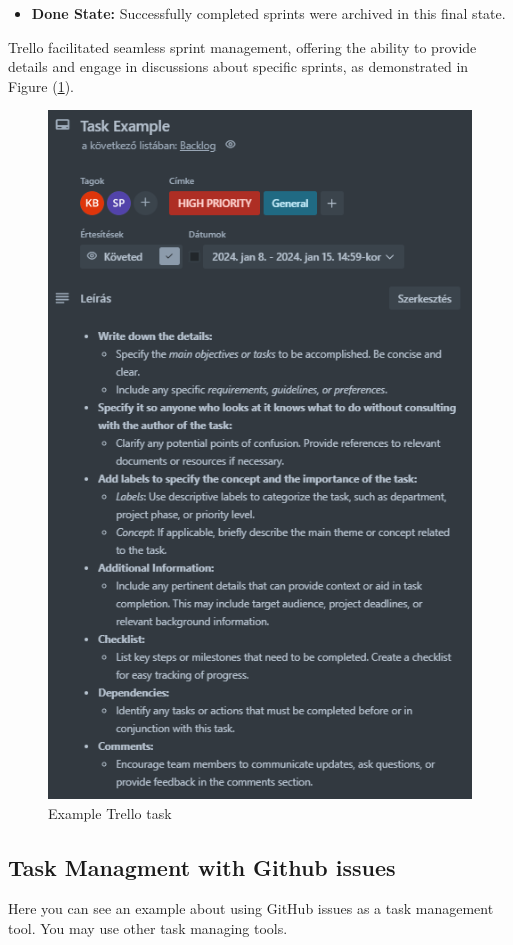 \documentclass[12pt,a4paper]{article}
\begin{document}
\begin{spacing}{1.5}
\begin{itemize}
        \item \textbf{Done State:}
              Successfully completed sprints were archived in this final state.

    \end{itemize}

    Trello facilitated seamless sprint management, offering the ability to provide
    details and engage in discussions about specific sprints, as demonstrated in
    Figure (\ref{fig:trello-task-example}).

    \begin{figure}[H]
        \centering
        \includegraphics[width=0.7\linewidth]{assets/trello-task-example.png}
        \caption{Example Trello task}
        \label{fig:trello-task-example}%
    \end{figure}
    \FloatBarrier

    \subsection{Task Managment with Github issues}\label{subseq:task-managment-github-issue}

    Here you can see an example about using GitHub issues as a task management
    tool. You may use other task managing tools.


\end{spacing}
\end{document}
